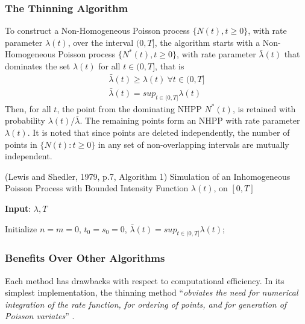 \documentclass[%
 reprint,
 amsmath,amssymb,
 aps,
]{revtex4-2}
\theoremstyle{definition}
\begin{document}
\subsubsection{The Thinning Algorithm}
To construct a Non-Homogeneous Poisson process $\{N(t) , t \ge 0 \}$, with rate parameter $\lambda(t)$, over the interval $(0,T]$, the algorithm starts with a Non-Homogeneous Poisson process $\{N^{*}(t) , t \ge 0 \}$, with rate parameter $\bar{\lambda}(t)$ that dominates the set $\lambda(t)$ for all $t \in (0,T]$, that is 
\begin{gather*}
\bar{\lambda}(t) \ge \lambda(t)\  \forall t \in (0,T]\\
\bar{\lambda}(t) = sup_{t\in(0,T]}\lambda(t)
\end{gather*}
Then, for all $t$, the point from the dominating NHPP $N^{*}(t)$, is retained with probability $\lambda(t)/\bar{\lambda}$. The remaining points form an NHPP with rate parameter $\lambda(t)$. It is noted that since points are deleted independently, the number of points in $\{N(t) : t \ge 0\}$ in any set of non-overlapping intervals are mutually independent.

\begin{algorithm}
\label{alg:1}
\caption{(Lewis and Shedler, 1979, p.7, Algorithm 1) Simulation of an Inhomogeneous Poisson Process with Bounded Intensity Function $\lambda(t)$, on $[0, T]$}
\textbf{Input}: $\lambda,T$

Initialize $n = m = 0$, $t_0 = s_0 = 0$, $\bar{\lambda}(t) = sup_{t\in(0,T]}\lambda(t)$;

\end{algorithm}

\subsubsection{Benefits Over Other Algorithms}
Each method has drawbacks with respect to computational efficiency. In its simplest implementation, the thinning method ``\textit{obviates the need for numerical integration of the rate function, for ordering of points, and for generation of Poisson variates}'' \cite{lewis_shedler_1979}. 
\end{document}
